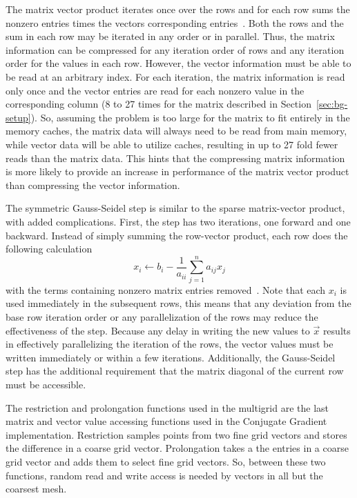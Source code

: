 The matrix vector product iterates once over the rows and for each row sums the nonzero entries times the vectors corresponding entries~\cite{Dongarra:2015:HPCG}.
Both the rows and the sum in each row may be iterated in any order or in parallel.
Thus, the matrix information can be compressed for any iteration order of rows and any iteration order for the values in each row.
However, the vector information must be able to be read at an arbitrary index.
For each iteration, the matrix information is read only once and the vector entries are read for each nonzero value in the corresponding column (8 to 27 times for the matrix described in Section~\ref{sec:bg-setup}).
So, assuming the problem is too large for the matrix to fit entirely in the memory caches, the matrix data will always need to be read from main memory, while vector data will be able to utilize caches, resulting in up to 27 fold fewer reads than the matrix data.
This hints that the compressing matrix information is more likely to provide an increase in performance of the matrix vector product than compressing the vector information.

The symmetric Gauss-Seidel step is similar to the sparse matrix-vector product, with added complications.
First, the step has two iterations, one forward and one backward.
Instead of simply summing the row-vector product, each row does the following calculation
\[
	x_i \gets b_i - \frac{1}{a_{ii}}\sum_{j=1}^{n}a_{ij}x_j
\]
with the terms containing nonzero matrix entries removed~\cite{Dongarra:2015:HPCG}.
Note that each \(x_i\) is used immediately in the subsequent rows, this means that any deviation from the base row iteration order or any parallelization of the rows may reduce the effectiveness of the step.
Because any delay in writing the new values to \(\vec{x}\) results in effectively parallelizing the iteration of the rows, the vector values must be written immediately or within a few iterations.
Additionally, the Gauss-Seidel step has the additional requirement that the matrix diagonal of the current row must be accessible.

The restriction and prolongation functions used in the multigrid are the last matrix and vector value accessing functions used in the Conjugate Gradient implementation.
Restriction samples points from two fine grid vectors and stores the difference in a coarse grid vector.
Prolongation takes a the entries in a coarse grid vector and adds them to select fine grid vectors.
So, between these two functions, random read and write access is needed by vectors in all but the coarsest mesh.


